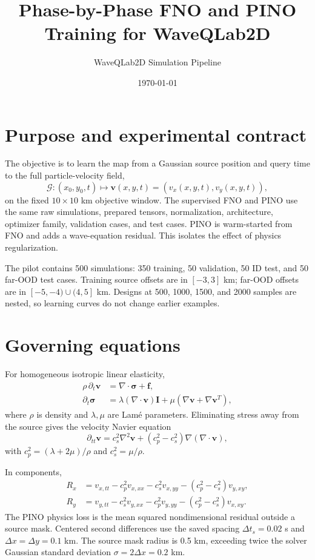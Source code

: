 \documentclass[11pt]{article}
\title{Phase-by-Phase FNO and PINO Training for WaveQLab2D}
\author{WaveQLab2D Simulation Pipeline}
\date{\today}
\begin{document}
\maketitle
\tableofcontents

\section{Purpose and experimental contract}
The objective is to learn the map from a Gaussian source position and query time to
the full particle-velocity field,
\[
  \mathcal{G}: (x_0,y_0,t)\longmapsto
  \bm v(x,y,t)=(v_x(x,y,t),v_y(x,y,t)),
\]
on the fixed $10\times10$ km objective window.  The supervised FNO and PINO use the
same raw simulations, prepared tensors, normalization, architecture, optimizer
family, validation cases, and test cases.  PINO is warm-started from FNO and adds a
wave-equation residual.  This isolates the effect of physics regularization.

The pilot contains 500 simulations: 350 training, 50 validation, 50 ID test, and 50
far-OOD test cases.  Training source offsets are in $[-3,3]$ km; far-OOD offsets are
in $[-5,-4)\cup(4,5]$ km.  Designs at 500, 1000, 1500, and 2000 samples are nested,
so learning curves do not change earlier examples.

\section{Governing equations}
For homogeneous isotropic linear elasticity,
\begin{align}
 \rho\,\partial_t \bm v &= \nabla\cdot\bm\sigma + \bm f,\\
 \partial_t\bm\sigma &= \lambda(\nabla\cdot\bm v)\bm I
        +\mu\left(\nabla\bm v+\nabla\bm v^T\right),
\end{align}
where $\rho$ is density and $\lambda,\mu$ are Lam\'e parameters.  Eliminating stress
away from the source gives the velocity Navier equation
\begin{equation}
 \partial_{tt}\bm v = c_s^2\nabla^2\bm v
 +(c_p^2-c_s^2)\nabla(\nabla\cdot\bm v),
 \label{eq:navier}
\end{equation}
with $c_p^2=(\lambda+2\mu)/\rho$ and $c_s^2=\mu/\rho$.

In components,
\begin{align}
R_x &= v_{x,tt}-c_p^2v_{x,xx}-c_s^2v_{x,yy}
 -(c_p^2-c_s^2)v_{y,xy},\\
R_y &= v_{y,tt}-c_s^2v_{y,xx}-c_p^2v_{y,yy}
 -(c_p^2-c_s^2)v_{x,xy}.
\end{align}
The PINO physics loss is the mean squared nondimensional residual outside a source
mask.  Centered second differences use the saved spacing $\Delta t_s=0.02$ s and
$\Delta x=\Delta y=0.1$ km.  The source mask radius is 0.5 km, exceeding twice the
solver Gaussian standard deviation $\sigma=2\Delta x=0.2$ km.
\end{document}
